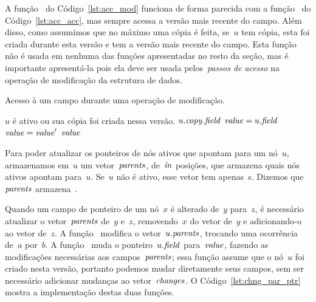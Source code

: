 \documentclass[../../main.tex]{subfiles}
\begin{document}
A função~ do Código~\ref{lst:acc_mod} funciona de forma parecida com a função~ do Código~\ref{lst:acc_acc}, mas sempre acessa a versão mais recente do campo. Além disso, como assumimos que no máximo uma cópia é feita, se~$u$ tem cópia, esta foi criada durante esta versão e tem a versão mais recente do campo. Esta função não é usada em nenhuma das funções apresentadas no resto da seção, mas é importante apresentá-la pois ela deve ser usada pelos~\emph{passos de acesso} na operação de modificação da estrutura de dados.

\begin{algorithm}
\caption{Acesso à um campo durante uma operação de modificação.} \label{lst:acc_mod}
\begin{algorithmic}[1]

\Require $u$ é ativo ou sua cópia foi criada nessa versão.
		\State \Return $u.\mathit{copy}.\mathit{field}$ 
	\Else
		\State $\mathit{value} = u.\mathit{field}$
				\State $\mathit{value} = \mathit{value}'$
			\EndIf
		\EndFor
		\State \Return $\mathit{value}$
	\EndIf
\EndFunction

\end{algorithmic}
\end{algorithm}

Para poder atualizar os ponteiros de nós ativos que apontam para um nó~$u$, armazenamos em~$u$ um vetor~$\mathit{parents}$, de~$\mathit{in}$ posições, que armazena quais nós ativos apontam para~$u$. Se~$u$ não é ativo, esse vetor tem apenas~s. Dizemos que~$\mathit{parents}$ armazena~.

Quando um campo de ponteiro de um nó~$x$ é alterado de~$y$ para~$z$, é necessário atualizar o vetor~$\mathit{parents}$ de~$y$ e~$z$, removendo~$x$ do vetor de~$y$ e adicionando-o ao vetor de~$z$. A função~\mbox{} modifica o vetor~$u.\mathit{parents}$, trocando uma ocorrência de~$a$ por~$b$. A função~\mbox{} muda o ponteiro~$u.\mathit{field}$ para~$\mathit{value}$, fazendo as modificações necessárias aos campos~$\mathit{parents}$; essa função assume que o nó~$u$ foi criado nesta versão, portanto podemos mudar diretamente seus campos, sem ser necessário adicionar mudanças ao vetor~$\mathit{changes}$. O Código~\ref{lst:chng_par_ptr} mostra a implementação destas duas funções.
\end{document}
